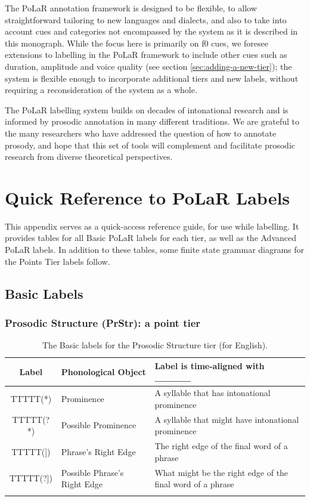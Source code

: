\documentclass[11pt, twoside]{memoir}
\begin{document}
The PoLaR annotation framework is designed to be flexible, to allow straightforward tailoring to new languages and dialects, and also to take into account cues and categories not encompassed by the system as it is described in this monograph. While the focus here is primarily on f0 cues, we foresee extensions to labelling in the PoLaR framework to include other cues such as duration, amplitude and voice quality (see section \ref{sec:adding-a-new-tier}); the system is flexible enough to incorporate additional tiers and new labels, without requiring a reconsideration of the system as a whole.

The PoLaR labelling system builds on decades of intonational research and is informed by prosodic annotation in many different traditions. We are grateful to the many researchers who have addressed the question of how to annotate prosody, and hope that this set of tools will complement and facilitate prosodic research from diverse theoretical perspectives.





\appendix
\chapter{Quick Reference to PoLaR Labels}\label{sec:polar-quick-reference-to-labels}

This appendix serves as a quick-access reference guide, for use while labelling. It provides tables for all Basic PoLaR labels for each tier, as well as the Advanced PoLaR labels. In addition to these tables, some finite state grammar diagrams for the Points Tier labels follow.


\section*{Basic Labels}

\subsection*{Prosodic Structure (PrStr): a point tier}
\begin{longtable}{clp{.525\linewidth}} \toprule \textbf{Label} & \textbf{Phonological Object} & \textbf{Label is time-aligned with \_\_\_\_\_}\tabularnewline
\midrule \endhead
TTTTT(*) & Prominence & A syllable that has intonational prominence \tabularnewline
TTTTT(?*) & Possible Prominence & A syllable that might have intonational prominence \tabularnewline
TTTTT(]) & Phrase’s Right Edge & The right edge of the final word of a phrase \tabularnewline
TTTTT(?]) & Possible Phrase’s Right Edge & What might be the right edge of the final word of a phrase \tabularnewline
\bottomrule 
\caption{The Basic labels for the Prosodic Structure tier (for English).%
}
\end{longtable}
\end{document}
